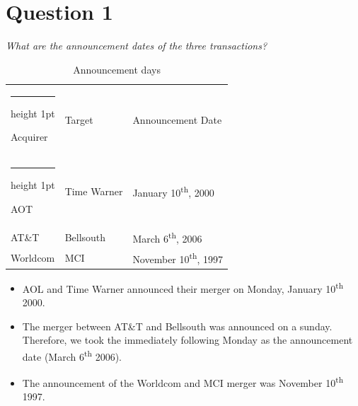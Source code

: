 \documentclass[11pt,a4paper,openany,oneside]{article}%
\makeatletter
\newcommand{\thickhline}{%
    \noalign {\ifnum 0=`}\fi \hrule height 1pt
    \futurelet \reserved@a \@xhline
}
\makeatother
\begin{document}
\section{Question 1}
\textit{What are the announcement dates of the three transactions?}
\begin{table}[H]
    \centering
    \begin{tabular}{|l|l|l|}
    \thickhline
         Acquirer & Target & Announcement Date \\\thickhline
         AOT& Time Warner & January 10\textsuperscript{th}, 2000 \\
         AT\&T& Bellsouth& March 6\textsuperscript{th}, 2006\\
        Worldcom& MCI& November 10\textsuperscript{th}, 1997\\ \hline
    \end{tabular}
    \caption{Announcement days}
    \label{aanounce}
\end{table}
\begin{itemize}
    \item AOL and Time Warner announced their merger on Monday, January 10\textsuperscript{th} 2000.
    \item The merger between AT\&T and Bellsouth was announced on a sunday. Therefore, we took the immediately following Monday as the announcement date (March 6\textsuperscript{th} 2006).
    \item The announcement of the Worldcom and MCI merger was November 10\textsuperscript{th} 1997.
\end{itemize}
\end{document}

